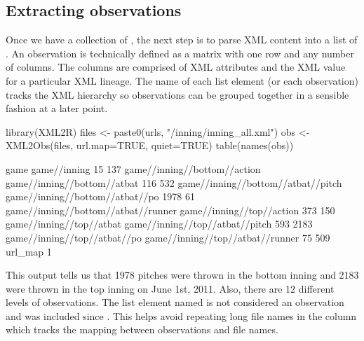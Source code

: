 \begin{article}
\subsection{Extracting observations}

Once we have a collection of , the next step is to parse
XML content into a list of . An observation is
technically defined as a matrix with one row and any number of columns.
The columns are comprised of XML attributes and the XML value for
a particular XML lineage. The name of each list element (or each observation)
tracks the XML hierarchy so observations can be grouped together in
a sensible fashion at a later point.

\begin{Schunk}
\begin{Sinput}
library(XML2R)
files <- paste0(urls, "/inning/inning_all.xml")
obs <- XML2Obs(files, url.map=TRUE, quiet=TRUE) 
table(names(obs))
\end{Sinput}
\begin{Soutput}

                               game                        game//inning 
                                 15                                 137 
       game//inning//bottom//action         game//inning//bottom//atbat 
                                116                                 532 
 game//inning//bottom//atbat//pitch     game//inning//bottom//atbat//po 
                               1978                                  61 
game//inning//bottom//atbat//runner           game//inning//top//action 
                                373                                 150 
           game//inning//top//atbat     game//inning//top//atbat//pitch 
                                593                                2183 
       game//inning//top//atbat//po    game//inning//top//atbat//runner 
                                 75                                 509 
                            url_map 
                                  1 
\end{Soutput}
\end{Schunk}


This output tells us that 1978
pitches were thrown in the bottom inning and 2183
were thrown in the top inning on June 1st, 2011. Also, there are 12
different levels of observations. The list element named 
is not considered an observation and was included since .
This helps avoid repeating long file names in the 
column which tracks the mapping between observations and file names. 


\end{article}
